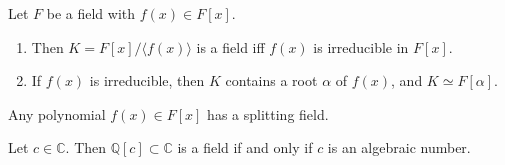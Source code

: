 \documentclass{article}
\begin{document}
  \begin{theorem}
    Let $F$ be a field with $f(x) \in F[x]$. 
    \begin{enumerate}
      \item Then $K = F[x] / \langle f(x) \rangle$ is a field iff $f(x)$ is irreducible in $F[x]$. 
      \item If $f(x)$ is irreducible, then $K$ contains a root $\alpha$ of $f(x)$, and $K \simeq F[\alpha]$. 
    \end{enumerate}
  \end{theorem}

  \begin{corollary}
    Any polynomial $f(x) \in F[x]$ has a splitting field. 
  \end{corollary}

  \begin{corollary}
    Let $c \in \mathbb{C}$. Then $\mathbb{Q}[c] \subset \mathbb{C}$ is a field if and only if $c$ is an algebraic number. 
  \end{corollary}
\end{document}
